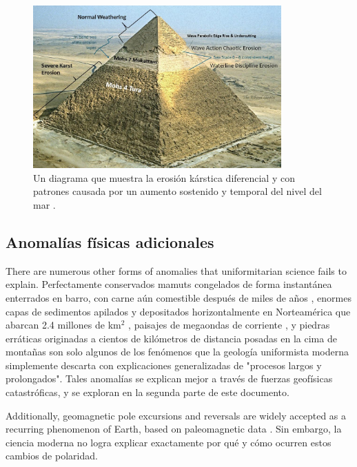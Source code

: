 \documentclass[10pt,twocolumn,letterpaper]{article}
\begin{document}
\begin{figure}[t]
\begin{center}
\includegraphics[width=0.85\textwidth]{khafre.jpg}
\end{center}
   \caption{Un diagrama que muestra la erosión kárstica diferencial y con patrones causada por un aumento sostenido y temporal del nivel del mar \cite{27}.}
\label{fig:4}
\end{figure}

\subsection{Anomalías físicas adicionales}

There are numerous other forms of anomalies that uniformitarian science fails to explain. Perfectamente conservados mamuts congelados de forma instantánea enterrados en barro, con carne aún comestible después de miles de años \cite{17,18,19}, enormes capas de sedimentos apilados y depositados horizontalmente en Norteamérica que abarcan 2.4 millones de km$^2$ \cite{21}, paisajes de megaondas de corriente \cite{22}, y piedras erráticas originadas a cientos de kilómetros de distancia posadas en la cima de montañas \cite{23,26} son solo algunos de los fenómenos que la geología uniformista moderna simplemente descarta con explicaciones generalizadas de "procesos largos y prolongados". Tales anomalías se explican mejor a través de fuerzas geofísicas catastróficas, y se exploran en la segunda parte de este documento.

Additionally, geomagnetic pole excursions and reversals are widely accepted as a recurring phenomenon of Earth, based on paleomagnetic data \cite{35,40,41}. Sin embargo, la ciencia moderna no logra explicar exactamente por qué y cómo ocurren estos cambios de polaridad.
\end{document}
